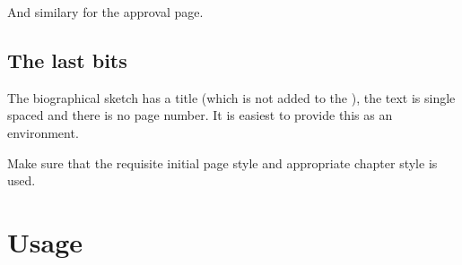     And similary for the approval page.

\begin{lcode}
\newcommand{\approvalpage}{{%
  \thispagestyle{empty}
  \centering
  \vspace*{-\toptafiddle}
  \asutitle \\ by \\ \asuauthor \\[3\onelineskip]
  has been approved \\
  \asudefdate

  \vfill

  Graduate Supervisory Committee: \\[-0.5\onelineskip]
  {\SingleSpacing
  \asuchair \\
  \asumembers}

  \vfill
  ACCEPTED BY THE GRADUATE COLLEGE 
  \par
  \enlargethispage{\bottafiddle}
  \clearpage}}
\end{lcode}

\subsection{The last bits}

    The biographical sketch has a title (which is not added to
the \toc), the text is single spaced and there is no page number. 
It is easiest to provide this as an environment.
\begin{lcode}
\newenvironment{biosketch}{%
  \pretoctitle{BIOGRAPHICAL SKETCH}\thispagestyle{empty}\SingleSpacing}%
  {}
\end{lcode}

    Make sure that the requisite initial page style and appropriate
chapter style is used.

\section{Usage}

